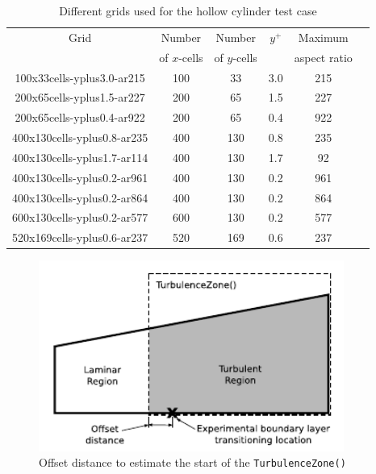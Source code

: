 \begin{table}[h]
  \caption{Different grids used for the hollow cylinder test case}
  \label{table-cylinder-grids}
  \begin{center}
    \begin{tabular}{cccccl}
      \hline\hline
      Grid & Number       & Number       & $y^+$ & Maximum \\
           & of $x$-cells & of $y$-cells &       & aspect ratio \\
      \hline
      100x33cells-yplus3.0-ar215   & 100  &  33 & 3.0 & 215 \\
      200x65cells-yplus1.5-ar227   & 200  &  65 & 1.5 & 227 \\
      200x65cells-yplus0.4-ar922   & 200  &  65 & 0.4 & 922 \\
      400x130cells-yplus0.8-ar235  & 400  & 130 & 0.8 & 235 \\
      400x130cells-yplus1.7-ar114  & 400  & 130 & 1.7 &  92 \\
      400x130cells-yplus0.2-ar961  & 400  & 130 & 0.2 & 961 \\
      400x130cells-yplus0.2-ar864  & 400  & 130 & 0.2 & 864 \\
      600x130cells-yplus0.2-ar577  & 600  & 130 & 0.2 & 577 \\
      520x169cells-yplus0.6-ar237  & 520  & 169 & 0.6 & 237 \\
      \hline \hline
    \end{tabular}
  \end{center}
\end{table}
%
\begin{figure}[h]
 \begin{center}
  \includegraphics[width=10cm]{./chap3-mallinson-cylinder/figs/turbulence-zone.pdf}
 \end{center}
 \caption{Offset distance to estimate the start of the \texttt{TurbulenceZone()}}
 \label{figure-cylinder-turbulence-zone}
\end{figure}


